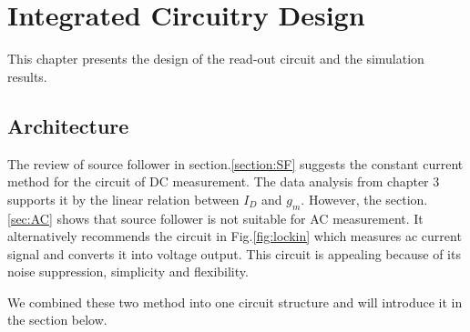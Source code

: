 \chapter{Integrated Circuitry Design}
This chapter presents the design of the read-out circuit and the simulation results.


\section{Architecture}
The review of source follower in section.\ref{section:SF} suggests the constant current method for the circuit of DC measurement.
The data analysis from chapter 3 supports it by the linear relation between $I_D$ and $g_m$.
However, the section.\ref{sec:AC} shows that source follower is not suitable for AC measurement.
It alternatively recommends the circuit in Fig.\ref{fig:lockin} which measures ac current signal and converts it into voltage output.
This circuit is appealing because of its noise suppression, simplicity and flexibility.

We combined these two method into one circuit structure and will introduce it in the section below.



